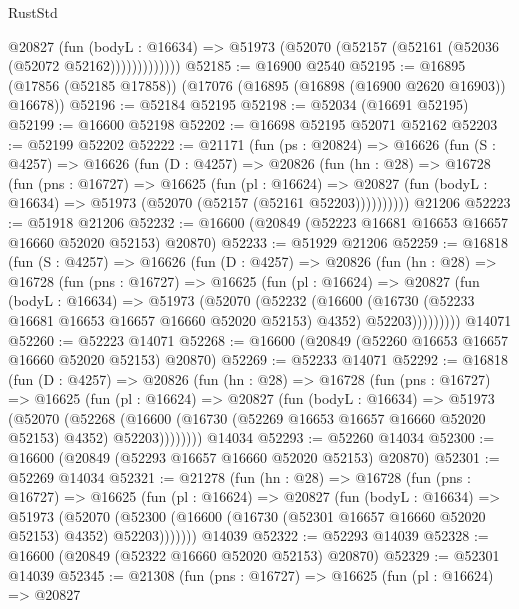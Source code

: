 \begin{lexlean}{RustStd}
\begin{coremodule}
                @20827
                  (fun (bodyL : @16634) =>
                  @51973 (@52070 (@52157 (@52161 (@52036 (@52072 @52162)))))))))))))
@52185 := @16900 @2540
@52195 := @16895 (@17856 (@52185 @17858)) (@17076 (@16895 (@16898 (@16900 @2620 @16903)) @16678))
@52196 := @52184 @52195
@52198 := @52034 (@16691 @52195)
@52199 := @16600 @52198
@52202 := @16698 @52195 @52071 @52162
@52203 := @52199 @52202
@52222 := @21171
    (fun (ps : @20824) =>
    @16626
      (fun (S : @4257) =>
      @16626
        (fun (D : @4257) =>
        @20826
          (fun (hn : @28) =>
          @16728
            (fun (pns : @16727) =>
            @16625
              (fun (pl : @16624) =>
              @20827 (fun (bodyL : @16634) => @51973 (@52070 (@52157 (@52161 @52203))))))))))
    @21206
@52223 := @51918 @21206
@52232 := @16600 (@20849 (@52223 @16681 @16653 @16657 @16660 @52020 @52153) @20870)
@52233 := @51929 @21206
@52259 := @16818
    (fun (S : @4257) =>
    @16626
      (fun (D : @4257) =>
      @20826
        (fun (hn : @28) =>
        @16728
          (fun (pns : @16727) =>
          @16625
            (fun (pl : @16624) =>
            @20827
              (fun (bodyL : @16634) =>
              @51973
                (@52070
                  (@52232
                    (@16600
                      (@16730 (@52233 @16681 @16653 @16657 @16660 @52020 @52153) @4352)
                      @52203)))))))))
    @14071
@52260 := @52223 @14071
@52268 := @16600 (@20849 (@52260 @16653 @16657 @16660 @52020 @52153) @20870)
@52269 := @52233 @14071
@52292 := @16818
    (fun (D : @4257) =>
    @20826
      (fun (hn : @28) =>
      @16728
        (fun (pns : @16727) =>
        @16625
          (fun (pl : @16624) =>
          @20827
            (fun (bodyL : @16634) =>
            @51973
              (@52070
                (@52268
                  (@16600 (@16730 (@52269 @16653 @16657 @16660 @52020 @52153) @4352) @52203))))))))
    @14034
@52293 := @52260 @14034
@52300 := @16600 (@20849 (@52293 @16657 @16660 @52020 @52153) @20870)
@52301 := @52269 @14034
@52321 := @21278
    (fun (hn : @28) =>
    @16728
      (fun (pns : @16727) =>
      @16625
        (fun (pl : @16624) =>
        @20827
          (fun (bodyL : @16634) =>
          @51973
            (@52070
              (@52300 (@16600 (@16730 (@52301 @16657 @16660 @52020 @52153) @4352) @52203)))))))
    @14039
@52322 := @52293 @14039
@52328 := @16600 (@20849 (@52322 @16660 @52020 @52153) @20870)
@52329 := @52301 @14039
@52345 := @21308
    (fun (pns : @16727) =>
    @16625
      (fun (pl : @16624) =>
      @20827

\end{coremodule}
\end{lexlean}
